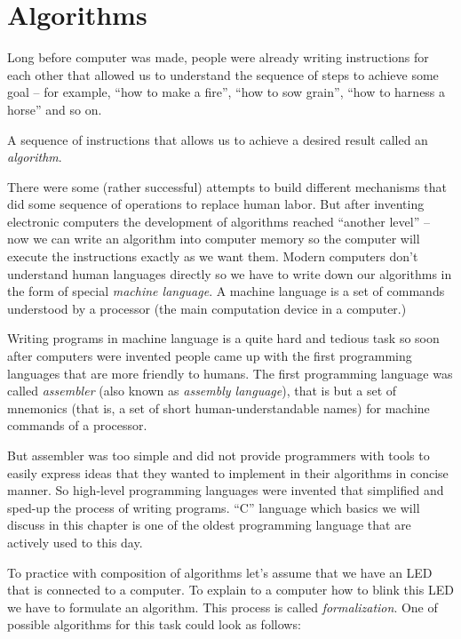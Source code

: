 \documentclass[../sparc.tex]{subfiles}
\begin{document}
\section{Algorithms}

Long before computer was made, people were already writing instructions for each
other that allowed us to understand the sequence of steps to achieve some goal --
for example, ``how to make a fire'', ``how to sow grain'', ``how to harness a
horse'' and so on.

A sequence of instructions that allows us to achieve a desired result called an
\emph{algorithm}.

There were some (rather successful) attempts to build different mechanisms that
did some sequence of operations to replace human labor.  But after inventing
electronic computers the development of algorithms reached ``another level'' --
now we can write an algorithm into computer memory so the computer will execute
the instructions exactly as we want them.  Modern computers don't understand
human languages directly so we have to write down our algorithms in the form of
special \emph{machine language}.  A machine language is a set of commands
understood by a processor (the main computation device in a computer.)

Writing programs in machine language is a quite hard and tedious task so soon
after computers were invented people came up with the first programming
languages that are more friendly to humans.  The first programming language was
called \emph{assembler} (also known as \emph{assembly language}), that is but a
set of mnemonics (that is, a set of short human-understandable names) for
machine commands of a processor.

But assembler was too simple and did not provide programmers with tools to
easily express ideas that they wanted to implement in their algorithms in
concise manner.  So high-level programming languages were invented that
simplified and sped-up the process of writing programs.  ``C'' language which
basics we will discuss in this chapter is one of the oldest programming language
that are actively used to this day.

To practice with composition of algorithms let's assume that we have an LED that
is connected to a computer.  To explain to a computer how to blink this LED we
have to formulate an algorithm.  This process is called \emph{formalization}.
One of possible algorithms for this task could look as follows:
\end{document}
